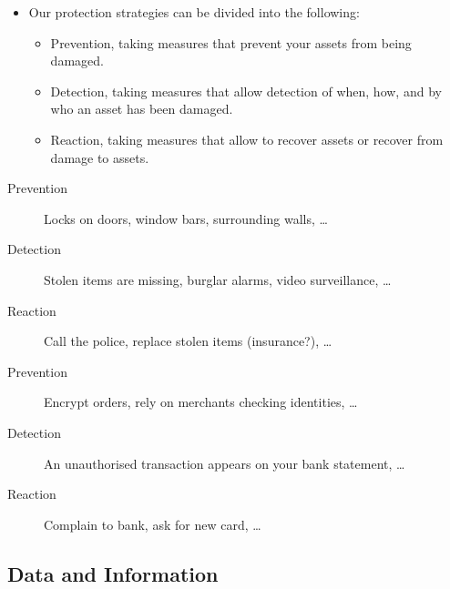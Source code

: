 \documentclass{beamer}
\begin{document}
\begin{frame}
  \begin{itemize}
    \item Our protection strategies can be divided into the following:
      \begin{itemize}
        \item Prevention, taking measures that prevent your assets from being 
          damaged.

        \item Detection, taking measures that allow detection of when, how, and 
          by who an asset has been damaged.

        \item Reaction, taking measures that allow to recover assets or recover 
          from damage to assets.
      \end{itemize}
  \end{itemize}
\end{frame}

\begin{frame}
  \begin{example}
    \begin{description}
      \item[Prevention] Locks on doors, window bars, surrounding walls, \dots
      \item[Detection] Stolen items are missing, burglar alarms, video 
        surveillance, \dots
      \item[Reaction] Call the police, replace stolen items (insurance?), \dots
    \end{description}
  \end{example}

  \begin{example}[E-commerce]
    \begin{description}
      \item[Prevention] Encrypt orders, rely on merchants checking identities, 
        \dots
      \item[Detection] An unauthorised transaction appears on your bank 
        statement, \dots
      \item[Reaction] Complain to bank, ask for new card, \dots
    \end{description}
  \end{example}
\end{frame}

\subsection{Data and Information}
\end{document}
